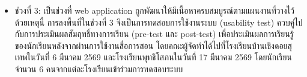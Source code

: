 \begin{itemize}
    \item ช่วงที่ 3: เป็นช่วงที่ web application ถูกพัฒนาให้มีเนื้อหาครบสมบูรณ์ตามแผนงานที่วางไว้ ด้วยเหตุนี้ การลงพื้นที่ในช่วงที่ 3 จึงเป็นการทดสอบการใช้งานระบบ (usability test) 
    ควบคู่ไปกับการประเมินผลสัมฤทธิ์ทางการเรียน (pre-test และ post-test) เพื่อประเมินผลการเรียนรู้ของนักเรียนหลังจากผ่านการใช้งานสื่อการสอน 
    โดยคณะผู้จัดทำได้ไปที่โรงเรียนบ้านเชิงดอยสุเทพในวันที่ 6 มีนาคม 2569 และโรงเรียนพุทธิโสภนในวันที่ 17 มีนาคม 2569 
    โดยนักเรียนจำนวน 6 คนจากแต่ละโรงเรียนเข้าร่วมการทดสอบระบบ
\end{itemize}


